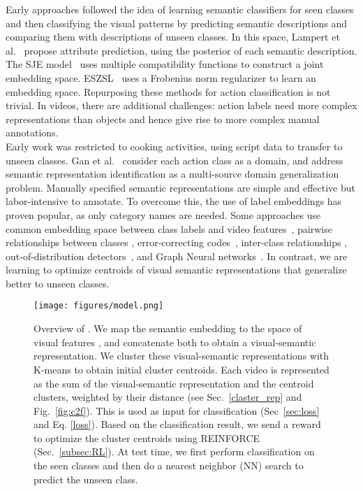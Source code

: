 \documentclass[runningheads]{llncs}
\begin{document}

Early approaches followed the idea of learning semantic classifiers for seen classes and then classifying the visual patterns by predicting semantic descriptions and comparing them with descriptions of unseen classes. In this space, Lampert et al.~\cite{lampert2009learning} propose attribute prediction, using the posterior of each semantic description. The SJE model~\cite{SJE} uses multiple compatibility functions to construct a joint embedding space. ESZSL~\cite{romera2015embarrassingly} uses a Frobenius norm
regularizer to learn an embedding space. Repurposing these methods for action classification is not trivial. In videos,
there are additional challenges: action labels need more complex representations than objects and hence give rise to more complex manual annotations. \\

Early work \cite{rohrbach12eccv} was restricted to cooking activities, using script data to transfer to unseen classes.
Gan et al.~\cite{gan2016learning} consider each action class as a domain, and address semantic representation identification as a multi-source domain generalization problem.  
Manually specified semantic representations are simple and effective \cite{zhu2018towards} but labor-intensive to annotate. To overcome this, the use of label embeddings has proven popular, as only category names are needed. Some approaches use common embedding space between class labels and video features~\cite{xu2016multi,xu2017transductive}, pairwise relationships between classes \cite{gan2016concepts}, error-correcting codes~\cite{qin2017zero}, inter-class relationships \cite{gan2015exploring}, out-of-distribution detectors~\cite{OD}, and Graph Neural networks~\cite{psgnn}. In contrast, we are learning to optimize centroids of visual semantic representations that generalize better to unseen classes. \\ 

\begin{figure*}[t]
    \centering
    \texttt{[image: figures/model.png]}
    \caption{Overview of \MethodName. We map the semantic embedding  to the space of visual features , and concatenate both to obtain a visual-semantic representation. We cluster these visual-semantic representations with K-means to obtain initial cluster centroids. Each video is represented as the sum of the visual-semantic representation and the centroid clusters, weighted by their distance (see Sec.~\ref{claster_rep} and Fig.~\ref{fig:c2f}). 
This is used as input for classification (Sec~\ref{sec:loss} and Eq. \ref{loss}). Based on the classification result, we send a reward to optimize the cluster centroids using REINFORCE (Sec.~\ref{subsec:RL}). At test time, we first perform classification on the seen classes and then do a nearest neighbor (NN) search to predict the unseen class.}
\label{fig:overview}
\end{figure*}
\end{document}
